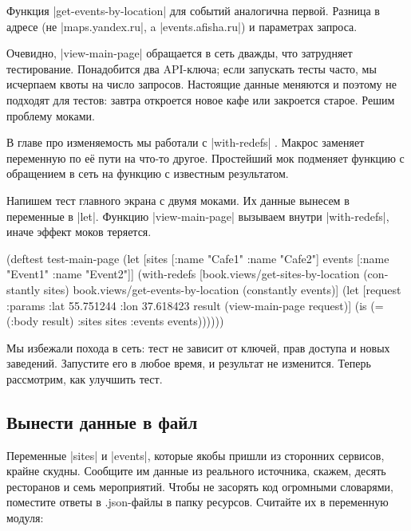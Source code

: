Функция \spverb|get-events-by-location| для событий аналогична первой. Разница в
адресе (не \spverb|maps.yandex.ru|, a \spverb|events.afisha.ru|) и параметрах
запроса.

Очевидно, \spverb|view-main-page| обращается в сеть дважды, что затрудняет
тестирование. Понадобится два API-ключа; если запускать тесты часто, мы
исчерпаем квоты на число запросов. Настоящие данные меняются и поэтому не
подходят для тестов: завтра откроется новое кафе или закроется старое. Решим
проблему моками.


В главе про изменяемость мы работали с \spverb|with-redefs| .
Макрос заменяет переменную по её пути на что-то другое. Простейший мок подменяет
функцию с обращением в сеть на функцию с известным результатом.

Напишем тест главного экрана с двумя моками. Их данные вынесем в переменные в
\spverb|let|. Функцию \spverb|view-main-page| вызываем  внутри
\spverb|with-redefs|, иначе эффект моков теряется.

\begin{english}
  \begin{clojure}
(deftest test-main-page
  (let [sites [{:name "Cafe1"} {:name "Cafe2"}]
        events [{:name "Event1"} {:name "Event2"}]]
    (with-redefs
      [book.views/get-sites-by-location (constantly sites)
       book.views/get-events-by-location (constantly events)]
      (let [request {:params {:lat 55.751244
                              :lon 37.618423}}
            result (view-main-page request)]
        (is (= (:body result)
               {:sites sites :events events}))))))
  \end{clojure}
\end{english}

Мы избежали похода в сеть: тест не зависит от ключей, прав доступа и новых
заведений. Запустите его в любое время, и результат не изменится. Теперь
рассмотрим, как улучшить тест.

\subsection{Вынести данные в файл}

Переменные \spverb|sites| и \spverb|events|, которые якобы пришли из сторонних
сервисов, крайне скудны. Сообщите им данные из реального источника, скажем,
десять ресторанов и семь мероприятий. Чтобы не засорять код огромными словарями,
поместите ответы в .json-файлы в папку ресурсов. Считайте их в переменную
модуля:

